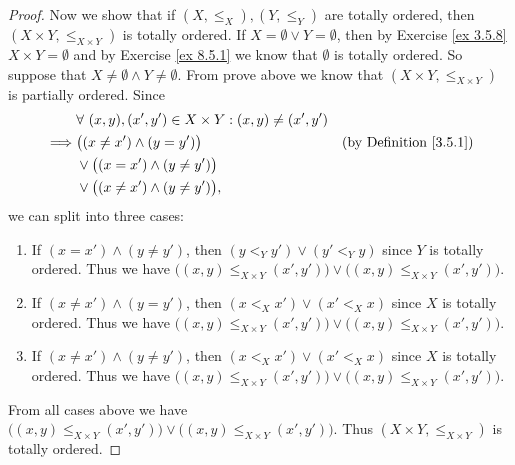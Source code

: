 \begin{proof}
    Now we show that if \((X, \leq_X), (Y, \leq_Y)\) are totally ordered, then \((X \times Y, \leq_{X \times Y})\) is totally ordered.
    If \(X = \emptyset \lor Y = \emptyset\), then by Exercise \ref{ex 3.5.8} \(X \times Y = \emptyset\) and by Exercise \ref{ex 8.5.1} we know that \(\emptyset\) is totally ordered.
    So suppose that \(X \neq \emptyset \land Y \neq \emptyset\).
    From prove above we know that \((X \times Y, \leq_{X \times Y})\) is partially ordered.
    Since
    \begin{align*}
                 & \forall\ (x, y), (x', y') \in X \times Y : (x, y) \neq (x', y')                                      \\
        \implies & \big((x \neq x') \land (y = y')\big)                            & \text{(by Definition \ref{3.5.1})} \\
                 & \lor \big((x = x') \land (y \neq y')\big)                                                            \\
                 & \lor \big((x \neq x') \land (y \neq y')\big),
    \end{align*}
    we can split into three cases:
    \begin{enumerate}
        \item If \((x = x') \land (y \neq y')\), then \((y <_Y y') \lor (y' <_Y y)\) since \(Y\) is totally ordered.
              Thus we have \(\big((x, y) \leq_{X \times Y} (x', y')\big) \lor \big((x, y) \leq_{X \times Y} (x', y')\big)\).
        \item If \((x \neq x') \land (y = y')\), then \((x <_X x') \lor (x' <_X x)\) since \(X\) is totally ordered.
              Thus we have \(\big((x, y) \leq_{X \times Y} (x', y')\big) \lor \big((x, y) \leq_{X \times Y} (x', y')\big)\).
        \item If \((x \neq x') \land (y \neq y')\), then \((x <_X x') \lor (x' <_X x)\) since \(X\) is totally ordered.
              Thus we have \(\big((x, y) \leq_{X \times Y} (x', y')\big) \lor \big((x, y) \leq_{X \times Y} (x', y')\big)\).
    \end{enumerate}
    From all cases above we have \(\big((x, y) \leq_{X \times Y} (x', y')\big) \lor \big((x, y) \leq_{X \times Y} (x', y')\big)\).
    Thus \((X \times Y, \leq_{X \times Y})\) is totally ordered.


\end{proof}
